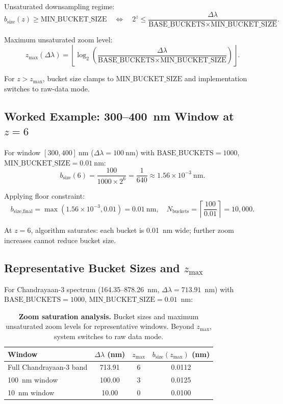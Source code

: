 \documentclass[11pt,a4paper]{article}
\begin{document}
Unsaturated downsampling regime:
\begin{equation}
b_{\text{size}}(z) \ge \text{MIN\_BUCKET\_SIZE} \quad\Longleftrightarrow\quad 2^z \le \frac{\Delta\lambda}{\text{BASE\_BUCKETS}\times \text{MIN\_BUCKET\_SIZE}}.
\end{equation}

Maximum unsaturated zoom level:
\begin{equation}
z_{\max}(\Delta\lambda) = \left\lfloor \log_2\left(\frac{\Delta\lambda}{\text{BASE\_BUCKETS}\times \text{MIN\_BUCKET\_SIZE}}\right) \right\rfloor.
\end{equation}

For $z > z_{\max}$, bucket size clamps to $\text{MIN\_BUCKET\_SIZE}$ and implementation switches to raw-data mode.

\subsection{Worked Example: 300--400~nm Window at $z=6$}

For window $[300, 400]~\text{nm}$ ($\Delta\lambda = 100~\text{nm}$) with $\text{BASE\_BUCKETS} = 1000$, $\text{MIN\_BUCKET\_SIZE} = 0.01~\text{nm}$:
\begin{equation}
b_{\text{size}}(6) = \frac{100}{1000\times 2^6} = \frac{1}{640} \approx 1.56\times 10^{-3}~\text{nm}.
\end{equation}

Applying floor constraint:
\begin{equation}
b_{\text{size,final}} = \max(1.56\times 10^{-3}, 0.01) = 0.01~\text{nm},\quad N_{\text{buckets}} = \left\lceil \frac{100}{0.01} \right\rceil = 10{,}000.
\end{equation}

At $z=6$, algorithm saturates: each bucket is \SI{0.01}{nm} wide; further zoom increases cannot reduce bucket size.

\subsection{Representative Bucket Sizes and $z_{\max}$}

For Chandrayaan-3 spectrum (164.35--878.26~nm, $\Delta\lambda = 713.91$~nm) with $\text{BASE\_BUCKETS} = 1000$, $\text{MIN\_BUCKET\_SIZE} = 0.01$~nm:

\begin{table}[H]
\centering
\caption{\textbf{Zoom saturation analysis.} Bucket sizes and maximum unsaturated zoom levels for representative windows. Beyond $z_{\max}$, system switches to raw data mode.}
\label{tab:zmax}
\small\sffamily
\begin{tabular}{@{}lccc@{}}
\toprule
\textbf{Window} & \boldmath$\Delta\lambda$ \textbf{(nm)} & \boldmath$z_{\max}$ & \boldmath$b_{\text{size}}(z_{\max})$ \textbf{(nm)} \\
\midrule
Full Chandrayaan-3 band & 713.91 & 6 & 0.0112 \\
100~nm window & 100.00 & 3 & 0.0125 \\
10~nm window & 10.00 & 0 & 0.0100 \\
\bottomrule
\end{tabular}
\end{table}
\end{document}
